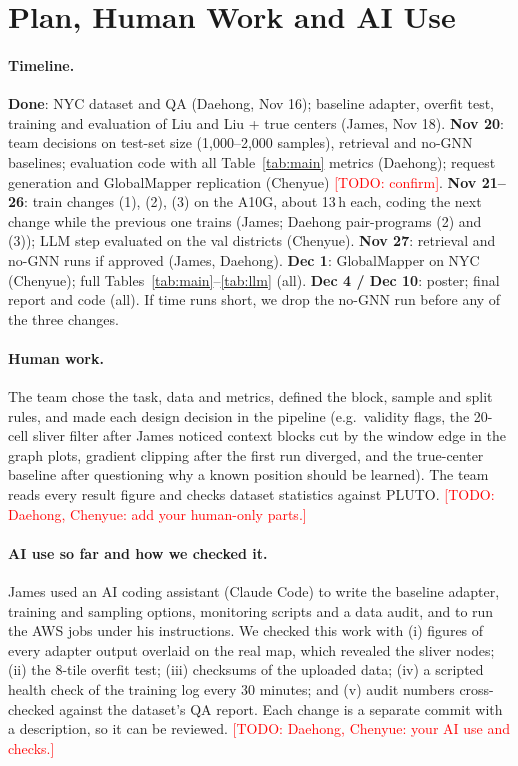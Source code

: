 \documentclass[twocolumn,11pt]{article}
\newcommand{\todo}[1]{\textcolor{red}{[TODO: #1]}}
\begin{document}
\section{Plan, Human Work and AI Use}
\paragraph{Timeline.} \textbf{Done}: NYC dataset and QA (Daehong, Nov 16); baseline adapter, overfit test, training and evaluation of Liu and Liu + true centers (James, Nov 18). \textbf{Nov 20}: team decisions on test-set size (1,000--2,000 samples), retrieval and no-GNN baselines; evaluation code with all Table~\ref{tab:main} metrics (Daehong); request generation and GlobalMapper replication (Chenyue) \todo{confirm}. \textbf{Nov 21--26}: train changes (1), (2), (3) on the A10G, about 13\,h each, coding the next change while the previous one trains (James; Daehong pair-programs (2) and (3)); LLM step evaluated on the val districts (Chenyue). \textbf{Nov 27}: retrieval and no-GNN runs if approved (James, Daehong). \textbf{Dec 1}: GlobalMapper on NYC (Chenyue); full Tables~\ref{tab:main}--\ref{tab:llm} (all). \textbf{Dec 4 / Dec 10}: poster; final report and code (all). If time runs short, we drop the no-GNN run before any of the three changes.

\paragraph{Human work.} The team chose the task, data and metrics, defined the block, sample and split rules, and made each design decision in the pipeline (e.g.\ validity flags, the 20-cell sliver filter after James noticed context blocks cut by the window edge in the graph plots, gradient clipping after the first run diverged, and the true-center baseline after questioning why a known position should be learned). The team reads every result figure and checks dataset statistics against PLUTO. \todo{Daehong, Chenyue: add your human-only parts.}

\paragraph{AI use so far and how we checked it.} James used an AI coding assistant (Claude Code) to write the baseline adapter, training and sampling options, monitoring scripts and a data audit, and to run the AWS jobs under his instructions. We checked this work with (i) figures of every adapter output overlaid on the real map, which revealed the sliver nodes; (ii) the 8-tile overfit test; (iii) checksums of the uploaded data; (iv) a scripted health check of the training log every 30 minutes; and (v) audit numbers cross-checked against the dataset's QA report. Each change is a separate commit with a description, so it can be reviewed. \todo{Daehong, Chenyue: your AI use and checks.}
\end{document}
